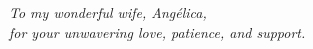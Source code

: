 \newpage
\thispagestyle{empty}
\begin{center}
    \vspace*{0.5\textheight}
    \textit{To my wonderful wife, Angélica,\\
    for your unwavering love, patience, and support.}
\end{center}
\newpage
